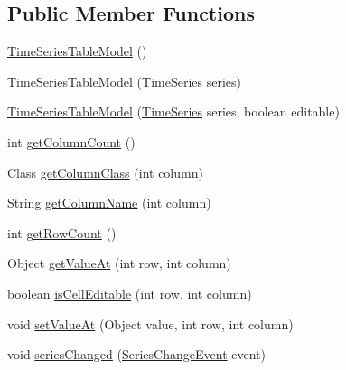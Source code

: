 \subsection*{Public Member Functions}
\begin{DoxyCompactItemize}
\item 
\mbox{\hyperlink{classorg_1_1jfree_1_1data_1_1time_1_1_time_series_table_model_a3a08169fd0eddd741a1aad1f18404b49}{Time\+Series\+Table\+Model}} ()
\item 
\mbox{\hyperlink{classorg_1_1jfree_1_1data_1_1time_1_1_time_series_table_model_a874efc4cdbfbe3d452a3b2b3fd449f3e}{Time\+Series\+Table\+Model}} (\mbox{\hyperlink{classorg_1_1jfree_1_1data_1_1time_1_1_time_series}{Time\+Series}} series)
\item 
\mbox{\hyperlink{classorg_1_1jfree_1_1data_1_1time_1_1_time_series_table_model_ad524cb12d70d742375e976567e70e08b}{Time\+Series\+Table\+Model}} (\mbox{\hyperlink{classorg_1_1jfree_1_1data_1_1time_1_1_time_series}{Time\+Series}} series, boolean editable)
\item 
int \mbox{\hyperlink{classorg_1_1jfree_1_1data_1_1time_1_1_time_series_table_model_a44554c6ac3a714a712f1d1869aeeefaa}{get\+Column\+Count}} ()
\item 
Class \mbox{\hyperlink{classorg_1_1jfree_1_1data_1_1time_1_1_time_series_table_model_a8202186bf96944757cb1c29673d56bef}{get\+Column\+Class}} (int column)
\item 
String \mbox{\hyperlink{classorg_1_1jfree_1_1data_1_1time_1_1_time_series_table_model_a52b4391901d138d134b3d1b236dcdb09}{get\+Column\+Name}} (int column)
\item 
int \mbox{\hyperlink{classorg_1_1jfree_1_1data_1_1time_1_1_time_series_table_model_a67dae9d68ae70b6f11a003cd01004584}{get\+Row\+Count}} ()
\item 
Object \mbox{\hyperlink{classorg_1_1jfree_1_1data_1_1time_1_1_time_series_table_model_aa7c4e79d191e71bca00e22c7318b5997}{get\+Value\+At}} (int row, int column)
\item 
boolean \mbox{\hyperlink{classorg_1_1jfree_1_1data_1_1time_1_1_time_series_table_model_af32cedeced693f9ceb8d4d15e2c556e6}{is\+Cell\+Editable}} (int row, int column)
\item 
void \mbox{\hyperlink{classorg_1_1jfree_1_1data_1_1time_1_1_time_series_table_model_ad5abdf4a9321a1b9ba716f786ad5131f}{set\+Value\+At}} (Object value, int row, int column)
\item 
void \mbox{\hyperlink{classorg_1_1jfree_1_1data_1_1time_1_1_time_series_table_model_a677a0cd7e6da07877e06848a43056c26}{series\+Changed}} (\mbox{\hyperlink{classorg_1_1jfree_1_1data_1_1general_1_1_series_change_event}{Series\+Change\+Event}} event)
\end{DoxyCompactItemize}


